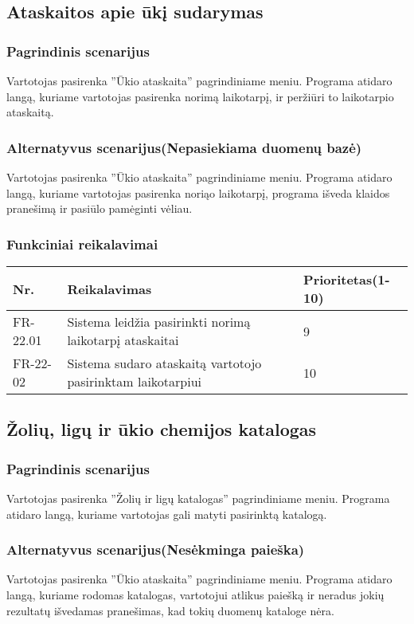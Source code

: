 \documentclass[oneside]{VUMIFPSkursinis}
\begin{document}
\subsection{Ataskaitos apie ūkį sudarymas}
	\subsubsection{Pagrindinis scenarijus}
	Vartotojas pasirenka ''Ūkio ataskaita'' pagrindiniame meniu. Programa atidaro langą, kuriame vartotojas pasirenka norimą laikotarpį, ir peržiūri to laikotarpio ataskaitą.
	\subsubsection{Alternatyvus scenarijus(Nepasiekiama duomenų bazė)}
	Vartotojas pasirenka ''Ūkio ataskaita'' pagrindiniame meniu. Programa atidaro langą, kuriame vartotojas pasirenka noriąo laikotarpį, programa išveda klaidos pranešimą ir pasiūlo pamėginti vėliau.
	\subsubsection{Funkciniai reikalavimai}
	\begin{table}[htbp]
		\begin{tabularx}{1\textwidth}{ |P{2.5cm}|X|P{3cm }| }  \hline
			Nr. & Reikalavimas & Prioritetas(1-10) \\ \hline
			FR-22.01 & Sistema leidžia pasirinkti norimą laikotarpį ataskaitai & 9 \\ \hline
			FR-22-02 & Sistema sudaro ataskaitą vartotojo pasirinktam laikotarpiui & 10 \\ \hline	
		\end{tabularx}
	\end{table}
\subsection{Žolių, ligų ir ūkio chemijos katalogas}
	\subsubsection{Pagrindinis scenarijus}
	Vartotojas pasirenka ''Žolių ir ligų katalogas'' pagrindiniame meniu. Programa atidaro langą, kuriame vartotojas gali matyti pasirinktą katalogą.
	\subsubsection{Alternatyvus scenarijus(Nesėkminga paieška)}
	Vartotojas pasirenka ''Ūkio ataskaita'' pagrindiniame meniu. Programa atidaro langą, kuriame rodomas katalogas, vartotojui atlikus paiešką ir neradus jokių rezultatų išvedamas pranešimas, kad tokių duomenų kataloge nėra.
\end{document}
